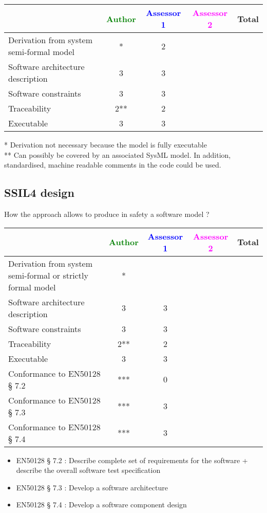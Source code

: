 \begin{tabular}{|l | c | c | c | c|}
\hline
& \textcolor{green}{Author} & \textcolor{blue}{Assessor 1} & \textcolor{magenta}{Assessor 2} & Total \\
\hline
Derivation from system semi-formal model &* &2 & & \\
\hline
Software architecture description &3 &3 & & \\
\hline
Software constraints &3 &3 & & \\
\hline
Traceability &2** &2 & & \\
\hline
Executable &3 &3 & & \\
\hline
\end{tabular}

\begin{author_comment}
* Derivation not necessary because the model is fully executable\\
** Can possibly be covered by an associated SysML model. In addition, standardised, machine readable comments in the code could be used.\\
\end{author_comment}

\subsection{SSIL4 design}

How the approach allows to produce in safety a software model ?

\begin{tabular}{|l | c | c | c | c|}
\hline
& \textcolor{green}{Author} & \textcolor{blue}{Assessor 1} & \textcolor{magenta}{Assessor 2} & Total \\
\hline
Derivation from system semi-formal or strictly formal model &* & & & \\
\hline
Software architecture description &3 & 3 & & \\
\hline
Software constraints &3 &3 & & \\
\hline
Traceability &2** &2 & & \\
\hline
Executable &3 &3 & & \\
\hline
Conformance to EN50128 § 7.2 &*** &0 & & \\
\hline
Conformance to EN50128 § 7.3 &*** &3 & & \\
\hline
Conformance to EN50128 § 7.4 &*** &3 & & \\
\hline
\end{tabular}
\begin{assessor1}
\begin{itemize}
\item  EN50128 § 7.2 : Describe complete set of requirements for the
  software + describe the overall software test specification
\item EN50128 § 7.3 :  Develop a software architecture 
\item EN50128 § 7.4 : Develop a software component design
\end{itemize}
\end{assessor1}

